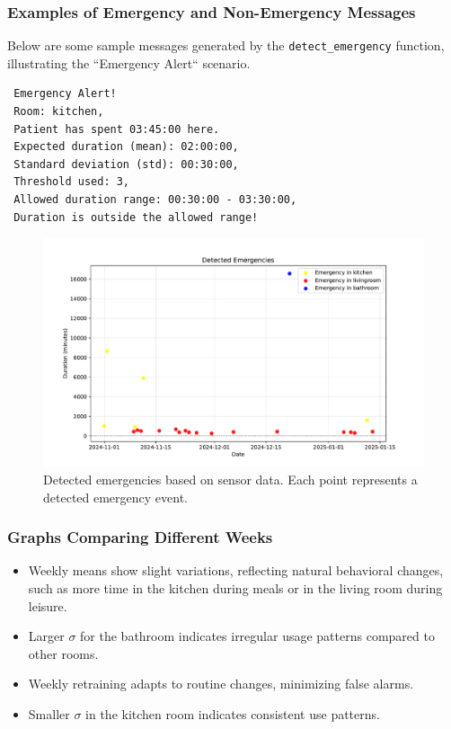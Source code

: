 \documentclass[A4,10pt]{article}
\begin{document}
\subsubsection*{Examples of Emergency and Non-Emergency Messages}

Below are some sample messages generated by the \texttt{detect\_emergency} function, illustrating the ``Emergency Alert`` scenario.

\begin{verbatim}
 Emergency Alert!
 Room: kitchen,
 Patient has spent 03:45:00 here.
 Expected duration (mean): 02:00:00,
 Standard deviation (std): 00:30:00,
 Threshold used: 3,
 Allowed duration range: 00:30:00 - 03:30:00,
 Duration is outside the allowed range!
\end{verbatim}

\begin{figure}[H]
	\centering
	\includegraphics[width=1.15\textwidth]{detected_emergencies.pdf}
	\caption{Detected emergencies based on sensor data. Each point represents a detected emergency event.}
	\label{fig:detected_emergencies}
\end{figure}

\subsubsection{Graphs Comparing Different Weeks}
\begin{itemize}
\item Weekly means show slight variations, reflecting natural behavioral changes, such as more time in the kitchen during meals or in the living room during leisure.
\item Larger \(\sigma\) for the bathroom indicates irregular usage patterns compared to other rooms.
\item  Weekly retraining adapts to routine changes, minimizing false alarms.
\item Smaller \(\sigma\) in the kitchen room indicates consistent use patterns.

\end{itemize}
\end{document}
